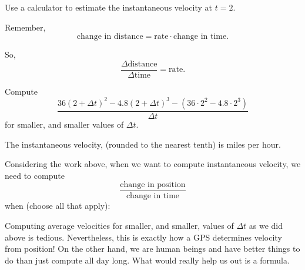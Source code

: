 \documentclass{ximera}
\begin{document}
\begin{problem}
  Use a calculator to estimate the instantaneous velocity at $t=2$.
  \begin{hint}
    Remember, 
    \[
    \text{change in distance} = \text{rate}\cdot\text{change in time}.
    \]
  \end{hint}
  \begin{hint}
    So, 
    \[
    \frac{\Delta\text{distance}}{\Delta\text{time}} = \text{rate}.
    \]
  \end{hint}
  \begin{hint}
    Compute
    \[
    \frac{36(2+\Delta t)^2 -4.8(2+\Delta t)^3 -\left(36\cdot 2^2 -4.8\cdot 2^3\right) }{\Delta t}
    \]
    for smaller, and smaller values of $\Delta t$.
  \end{hint}
  \begin{prompt}
    The instantaneous velocity, (rounded to the nearest tenth) is  miles per hour.
  \end{prompt}
\end{problem}


\begin{problem}
  Considering the work above, when we want to compute instantaneous
  velocity, we need to compute
  \[
  \frac{\text{change in position}}{\text{change in time}}
  \]
  when (choose all that apply):
  \begin{multipleResponse}%
  \end{multipleResponse}
\end{problem}


Computing average velocities for smaller, and smaller, values of
$\Delta t$ as we did above is tedious. Nevertheless, this is exactly
how a GPS determines velocity from position! On the other hand, we are
human beings and have better things to do than just compute all day
long. What would really help us out is a formula.




\end{document}
